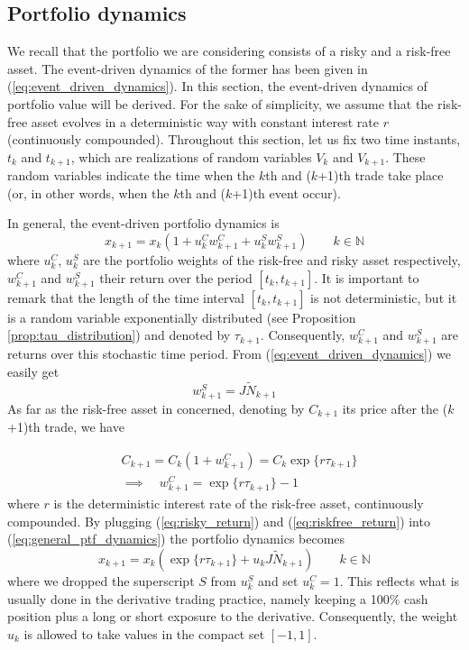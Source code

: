 \subsection{Portfolio dynamics}
We recall that the portfolio we are considering consists of a risky and a risk-free asset. The event-driven dynamics of the former has been given in (\ref{eq:event_driven_dynamics}). In this section, the event-driven dynamics of portfolio value will be derived. For the sake of simplicity, we assume that the risk-free asset evolves in a deterministic way with constant interest rate $r$ (continuously compounded). Throughout this section, let us fix two time instants, $t_k$ and $t_{k+1}$, which are realizations of random variables $V_k$ and $V_{k+1}$. These random variables indicate the time when the $k$th and ($k$+1)th trade take place (or, in other words, when the $k$th and ($k$+1)th event occur).

In general, the event-driven portfolio dynamics is
\begin{equation}\label{eq:general_ptf_dynamics}
x_{k+1} = x_k(1+u_{k}^C w_{k+1}^{C} + u_{k}^S w_{k+1}^S) \qquad k \in \mathbb{N}
\end{equation}
where $u_{k}^C$, $u_{k}^S$ are the portfolio weights of the risk-free and risky asset respectively, $w_{k+1}^{C}$ and $w_{k+1}^S$ their return over the period $[t_k,t_{k+1}]$. It is important to remark that the length of the time interval $[t_k,t_{k+1}]$ is not deterministic, but it is a random variable exponentially distributed (see Proposition \ref{prop:tau_distribution}) and denoted by $\tau_{k+1}$. Consequently, $w_{k+1}^{C}$ and $w_{k+1}^S$ are returns over this stochastic time period. From (\ref{eq:event_driven_dynamics}) we easily get
\begin{equation}\label{eq:risky_return}
w_{k+1}^S=J\widetilde{N}_{k+1}
\end{equation}
As far as the risk-free asset in concerned, denoting by $C_{k+1}$ its price after the ($k$+1)th trade, we have

\begin{align}\label{eq:riskfree_return}
	\nonumber
	&C_{k+1} = C_k(1+w_{k+1}^{C}) = C_k \exp\{r \tau_{k+1}\}\\
	& \implies \quad w_{k+1}^{C} = \exp\{r \tau_{k+1}\}-1
\end{align}
where $r$ is the deterministic interest rate of the risk-free asset, continuously compounded. By plugging (\ref{eq:risky_return}) and (\ref{eq:riskfree_return}) into (\ref{eq:general_ptf_dynamics}) the portfolio dynamics becomes
\begin{equation}\label{eq:ptf_dynamic_ED}
\boxed{x_{k+1}= x_k(\exp\{r\tau_{k+1}\} + u_{k}J\widetilde{N}_{k+1} ) } \qquad k \in \mathbb{N}
\end{equation}	
where we dropped the superscript $S$ from $u_{k}^S$ and set $u_k^C=1$. This reflects what is usually done in the derivative trading practice, namely keeping a 100\% cash position plus a long or short exposure to the derivative. Consequently, the weight $u_{k}$ is allowed to take values in the compact set $[-1,1]$. 

